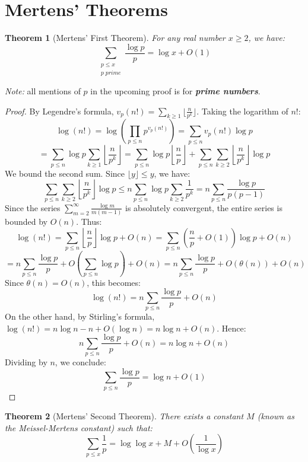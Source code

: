 \documentclass[a4paper]{article}
\newtheorem{theorem}{Theorem}
\begin{document}
\section{Mertens' Theorems}

\begin{theorem}[Mertens' First Theorem]
  For any real number $x \ge 2$, we have:
  \[ \sum_{\substack{p \le x \\ p \; prime}} \frac{\log p}{p} = \log x + O(1) \]
\end{theorem}

\textit{Note:} all mentions of $p$ in the upcoming proof is for
\textbf{\textit{prime numbers}}.

\begin{proof}
  By Legendre's formula, $v_p(n!) = \sum_{k \ge 1} \lfloor
  \frac{n}{p^k} \rfloor$. Taking the logarithm of $n!$:
  \[ \log(n!) = \log\left(\prod_{p \le n} p^{v_p(n!)}\right) =
  \sum_{p \le n} v_p(n!) \log p \]
  \[ = \sum_{p \le n} \log p \sum_{k \ge 1} \left\lfloor
    \frac{n}{p^k} \right\rfloor = \sum_{p \le n} \log p \left\lfloor
    \frac{n}{p} \right\rfloor + \sum_{p \le n} \sum_{k \ge 2}
  \left\lfloor \frac{n}{p^k} \right\rfloor \log p \]
  We bound the second sum. Since $\lfloor y \rfloor \le y$, we have:
  \[ \sum_{p \le n} \sum_{k \ge 2} \left\lfloor \frac{n}{p^k}
    \right\rfloor \log p \le n \sum_{p \le n} \log p \sum_{k \ge 2}
  \frac{1}{p^k} = n \sum_{p \le n} \frac{\log p}{p(p-1)} \]
  Since the series $\sum_{m=2}^{\infty} \frac{\log m}{m(m-1)}$ is
  absolutely convergent, the entire series is bounded by $O(n)$. Thus:
  \[ \log(n!) = \sum_{p \le n} \left\lfloor \frac{n}{p} \right\rfloor
    \log p + O(n) = \sum_{p \le n} \left( \frac{n}{p} + O(1) \right)
  \log p + O(n) \]
  \[ = n \sum_{p \le n} \frac{\log p}{p} + O\left(\sum_{p \le n} \log
  p\right) + O(n) = n \sum_{p \le n} \frac{\log p}{p} + O(\theta(n)) + O(n) \]
  Since $\theta(n) = O(n)$, this becomes:
  \[ \log(n!) = n \sum_{p \le n} \frac{\log p}{p} + O(n) \]
  On the other hand, by Stirling's formula, $\log(n!) = n \log n - n
  + O(\log n) = n \log n + O(n)$. Hence:
  \[ n \sum_{p \le n} \frac{\log p}{p} + O(n) = n \log n + O(n) \]
  Dividing by $n$, we conclude:
  \[ \sum_{p \le n} \frac{\log p}{p} = \log n + O(1) \]
\end{proof}

\begin{theorem}[Mertens' Second Theorem]
  There exists a constant $M$ (known as the Meissel-Mertens
  constant) such that:
  \[ \sum_{p \le x} \frac{1}{p} = \log \log x + M +
  O\left(\frac{1}{\log x}\right) \]
\end{theorem}
\end{document}

